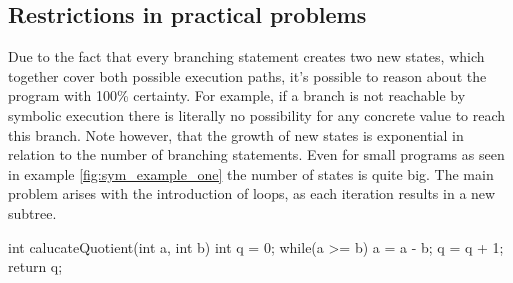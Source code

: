 \subsection{Restrictions in practical problems}\label{section:symbolic_restrictions}
Due to the fact that every branching statement creates two new states, which together cover both possible execution paths, it's possible to reason about the program with 100\% certainty. For example, if a branch is not reachable by symbolic execution there is literally no possibility for any concrete value to reach this branch. Note however, that the growth of new states is exponential in relation to the number of branching statements. Even for small programs as seen in example \ref{fig:sym_example_one} the number of states is quite big. The main problem arises with the introduction of loops, as each iteration results in a new subtree.
\begin{codesnippet}[caption={Symbolic Execution Looping}, label={codeSnippet:symbolicExecutionLoop}]
int calucateQuotient(int a, int b){
   int q = 0;
   while(a >= b){
     a = a - b;
     q = q + 1;
   }
   return q;
}
\end{codesnippet}
